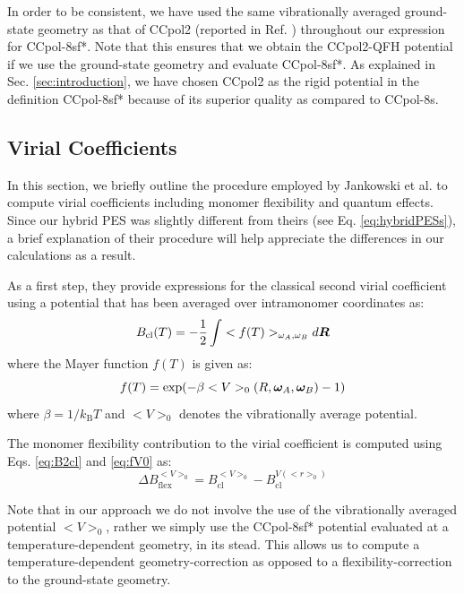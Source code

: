             In order to be consistent, we have used the same vibrationally averaged ground-state geometry as that of CCpol2 (reported in Ref. \cite{Gora2014}) throughout our expression for CCpol-8sf*. Note that this ensures that we obtain the CCpol2-QFH potential if we use the ground-state geometry and evaluate CCpol-8sf*. As explained in Sec. \ref{sec:introduction}, we have chosen CCpol2 as the rigid potential in the definition CCpol-8sf* because of its superior quality as compared to CCpol-8s.

        \subsection{Virial Coefficients}
            In this section, we briefly outline the procedure employed by Jankowski et al. \cite{Jankowski2015} to compute virial coefficients including monomer flexibility and quantum effects. Since our hybrid PES was slightly different from theirs (see Eq. \eqref{eq:hybridPESs}), a brief explanation of their procedure will help appreciate the differences in our calculations as a result.

            As a first step, they provide expressions for the classical second virial coefficient using a potential that has been averaged over intramonomer coordinates as:
            \begin{equation}
                \label{eq:B2cl}
                B_{\text{cl}} (T) = -\displaystyle\frac{1}{2} \int <f(T)>_{\omega_A, \omega_B} d{\boldsymbol {R}}
            \end{equation}
            where the Mayer function $f(T)$ is given as:
            \begin{equation}
                \label{eq:fV0}
                f(T) = \exp ( -\beta <V>_0 (R, {\boldsymbol {\omega}}_A, {\boldsymbol {\omega}}_B) - 1)
            \end{equation}
            where $\beta = 1/k_\text{B} T$ and $<V>_0$ denotes the vibrationally average potential.

            The monomer flexibility contribution to the virial coefficient is computed using Eqs. \eqref{eq:B2cl}  and \eqref{eq:fV0} as:
            \begin{equation}
                \label{eq:deltaBFlex}
                \Delta B_\text{flex}^{<V>_0} = B_\text{cl}^{<V>_0} -  B_\text{cl}^{V(<r>_0)}
            \end{equation}

            Note that in our approach we do not involve the use of the vibrationally averaged potential $<V>_0$, rather we simply use the CCpol-8sf* potential evaluated at a temperature-dependent geometry, in its stead. This allows us to compute a temperature-dependent geometry-correction as opposed to a flexibility-correction to the ground-state geometry.

